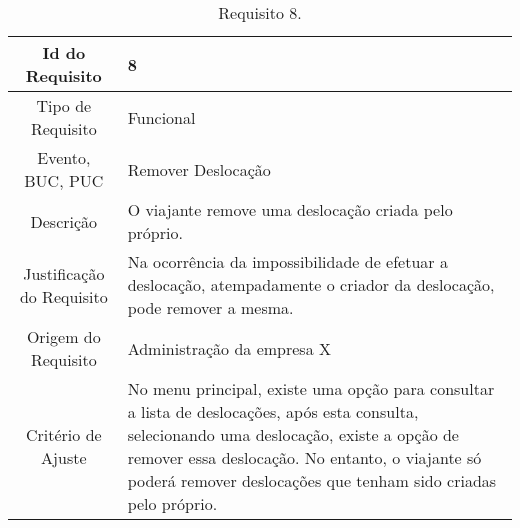 \begin{table}[H]
\begin{center}
  \begin{tabularx}{\textwidth}{ | c | X | }
    \hline
    Id do Requisito & 8  \\
    
    \hline
    Tipo de Requisito & Funcional \\
    
    \hline
    Evento, BUC, PUC &  Remover Deslocação\\
    
    \hline
    Descrição & O viajante remove uma deslocação criada pelo próprio. \\
    
    \hline
    Justificação do Requisito & Na ocorrência da impossibilidade de efetuar a deslocação, atempadamente o criador da deslocação, pode remover a mesma.  \\
    
    \hline
    Origem do Requisito & Administração da empresa X \\
    
    \hline
    Critério de Ajuste & No menu principal, existe uma opção para consultar a lista de deslocações, após esta consulta, selecionando uma deslocação, existe a opção de remover essa deslocação. No entanto, o viajante só poderá remover deslocações que tenham sido criadas pelo próprio.\\
    
    \hline
  \end{tabularx}
  \caption{Requisito 8.} \label{tab:r3}
\end{center}
\end{table}

